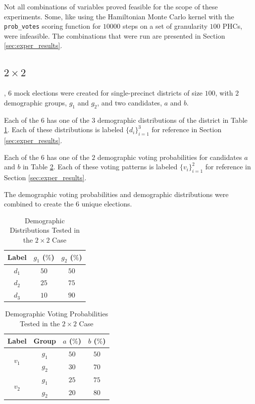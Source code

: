 Not all combinations of variables proved feasible for the scope of these experiments. Some, like using the Hamiltonian Monte Carlo kernel with the \texttt{prob\_votes} scoring function for $10000$ steps on a set of granularity $100$ PHCs, were infeasible. The combinations that were run are presented in Section \ref{sec:exper_results}.


\subsection{$2 \times 2$}
\label{subsec:two_by_two}

, $6$ mock elections were created for single-precinct districts of size $100$, with $2$ demographic groups, $g_1$ and $g_2$, and two candidates, $a$ and $b$.

Each of the $6$ has one of the $3$ demographic distributions of the district in Table \ref{table:demo_dist}. Each of these distributions is labeled $\{d_i\}_{i=1}^3$ for reference in Section \ref{sec:exper_results}.

Each of the $6$ has one of the $2$ demographic voting probabilities for candidates $a$ and $b$ in Table \ref{table:voting}. Each of these voting patterns is labeled $\{v_i\}_{i=1}^2$ for reference in Section \ref{sec:exper_results}.

The demographic voting probabilities and demographic distributions were combined to create the $6$ unique elections.

\begin{table}[ht]
 \centering
 \caption{Demographic Distributions Tested in the $2 \times 2$ Case}
 \label{table:demo_dist}
 \begin{tabular}{|c|c|c|}
   \hline
   Label & $g_1$ ($\%$) & $g_2$ ($\%$) \\
   \hline
   $d_1$ & $50$ & $50$ \\
   $d_2$ & $25$ & $75$ \\
   $d_3$ & $10$ & $90$ \\
  \hline
 \end{tabular}
\end{table}

\begin{table}[ht]
 \centering
 \caption{Demographic Voting Probabilities Tested in the $2 \times 2$ Case}
 \label{table:voting}
 \begin{tabular}{|c|c|c|c|}
   \hline
   Label & Group & $a$ ($\%$) & $b$ ($\%$) \\
   \hline
   \multirow{2}{*}{$v_1$} & $g_1$ & $50$ & $50$ \\
   & $g_2$ & $30$ & $70$ \\
   \hline
   \multirow{2}{*}{$v_2$} & $g_1$ & $25$ & $75$ \\
   & $g_2$ & $20$ & $80$ \\
  \hline
 \end{tabular}
\end{table}

